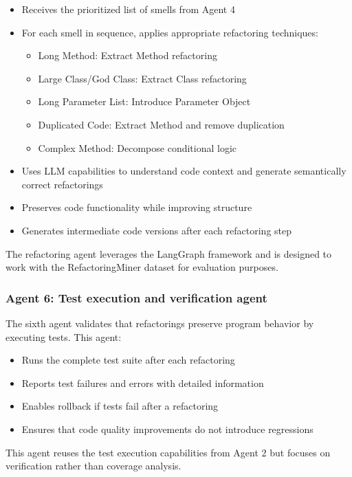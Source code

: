 \begin{itemize}
    \item Receives the prioritized list of smells from Agent 4
    \item For each smell in sequence, applies appropriate refactoring techniques:
    \begin{itemize}
        \item Long Method: Extract Method refactoring
        \item Large Class/God Class: Extract Class refactoring
        \item Long Parameter List: Introduce Parameter Object
        \item Duplicated Code: Extract Method and remove duplication
        \item Complex Method: Decompose conditional logic
    \end{itemize}
    \item Uses LLM capabilities to understand code context and generate semantically correct refactorings
    \item Preserves code functionality while improving structure
    \item Generates intermediate code versions after each refactoring step
\end{itemize}

The refactoring agent leverages the LangGraph framework and is designed to work with the RefactoringMiner dataset for evaluation purposes.

\subsubsection{Agent 6: Test execution and verification agent}

The sixth agent validates that refactorings preserve program behavior by executing tests. This agent:

\begin{itemize}
    \item Runs the complete test suite after each refactoring
    \item Reports test failures and errors with detailed information
    \item Enables rollback if tests fail after a refactoring
    \item Ensures that code quality improvements do not introduce regressions
\end{itemize}

This agent reuses the test execution capabilities from Agent 2 but focuses on verification rather than coverage analysis.

